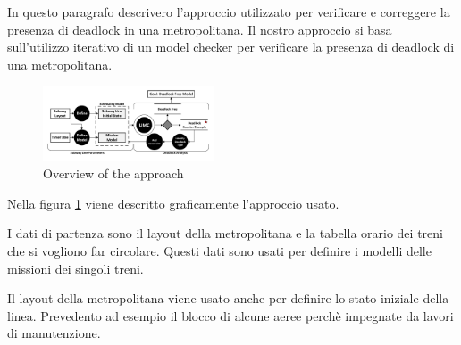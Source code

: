 


In questo paragrafo descrivero l'approccio utilizzato per verificare e correggere la presenza di deadlock in una metropolitana.
Il nostro approccio si basa sull'utilizzo iterativo di un model checker per verificare la presenza di deadlock di una metropolitana.

\begin{figure}[htp]
	\begin{centering}	
	\includegraphics[width=0.45\textwidth, clip]{img/processo}
	\caption{Overview of the approach}
	\label{fig:process}
	\end{centering}
\end{figure}

Nella figura \ref{fig:process} viene descritto graficamente l'approccio usato.

I dati di partenza sono  il layout della metropolitana e la tabella orario dei treni che si vogliono far circolare. Questi dati sono usati per definire
i modelli delle missioni dei singoli treni. 

Il layout della metropolitana viene usato anche per definire lo stato iniziale della linea. Prevedento ad esempio il blocco di alcune aeree perchè impegnate da lavori di manutenzione.